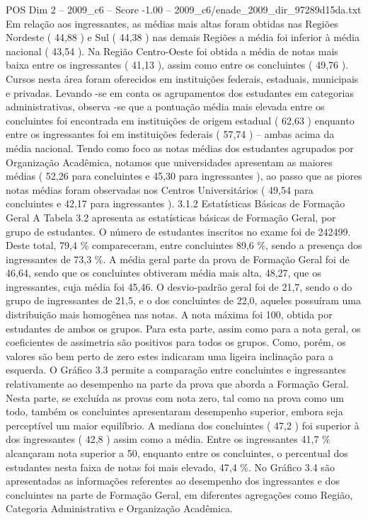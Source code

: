 \begin{textsample}{POS Dim 2 – 2009\_c6 – Score -1.00 – 2009\_c6/enade\_2009\_dir\_97289d15da.txt}
Em relação aos ingressantes, as médias mais altas foram obtidas nas Regiões Nordeste ( 44,88 ) e Sul ( 44,38 ) nas demais Regiões a média foi inferior à média nacional ( 43,54 ).
Na Região Centro-Oeste foi obtida a média de notas mais baixa entre os ingressantes ( 41,13 ), assim como entre os concluintes ( 49,76 ).
Cursos nesta área foram oferecidos em instituições federais, estaduais, municipais e privadas.
Levando -se em conta os agrupamentos dos estudantes em categorias administrativas, observa -se que a pontuação média mais elevada entre os concluintes foi encontrada em instituições de origem estadual ( 62,63 ) enquanto entre os ingressantes foi em instituições federais ( 57,74 ) – ambas acima da média nacional.
Tendo como foco as notas médias dos estudantes agrupados por Organização Acadêmica, notamos que universidades apresentam as maiores médias ( 52,26 para concluintes e 45,30 para ingressantes ), ao passo que as piores notas médias foram observadas nos Centros Universitários ( 49,54 para concluintes e 42,17 para ingressantes ). 3.1.2 Estatísticas Básicas de Formação Geral A Tabela 3.2 apresenta as estatísticas básicas de Formação Geral, por grupo de estudantes.
O número de estudantes inscritos no exame foi de 242499.
Deste total, 79,4 \% compareceram, entre concluintes 89,6 \%, sendo a presença dos ingressantes de 73,3 \%.
A média geral parte da prova de Formação Geral foi de 46,64, sendo que os concluintes obtiveram média mais alta, 48,27, que os ingressantes, cuja média foi 45,46.
O desvio-padrão geral foi de 21,7, sendo o do grupo de ingressantes de 21,5, e o dos concluintes de 22,0, aqueles possuíram uma distribuição mais homogênea nas notas.
A nota máxima foi 100, obtida por estudantes de ambos os grupos.
Para esta parte, assim como para a nota geral, os coeficientes de assimetria são positivos para todos os grupos.
Como, porém, os valores são bem perto de zero estes indicaram uma ligeira inclinação para a esquerda.
O Gráfico 3.3 permite a comparação entre concluintes e ingressantes relativamente ao desempenho na parte da prova que aborda a Formação Geral.
Nesta parte, se excluída as provas com nota zero, tal como na prova como um todo, também os concluintes apresentaram desempenho superior, embora seja perceptível um maior equilíbrio.
A mediana dos concluintes ( 47,2 ) foi superior à dos ingressantes ( 42,8 ) assim como a média.
Entre os ingressantes 41,7 \% alcançaram nota superior a 50, enquanto entre os concluintes, o percentual dos estudantes nesta faixa de notas foi mais elevado, 47,4 \%.
No Gráfico 3.4 são apresentadas as informações referentes ao desempenho dos ingressantes e dos concluintes na parte de Formação Geral, em diferentes agregações como Região, Categoria Administrativa e Organização Acadêmica.

\end{textsample}
